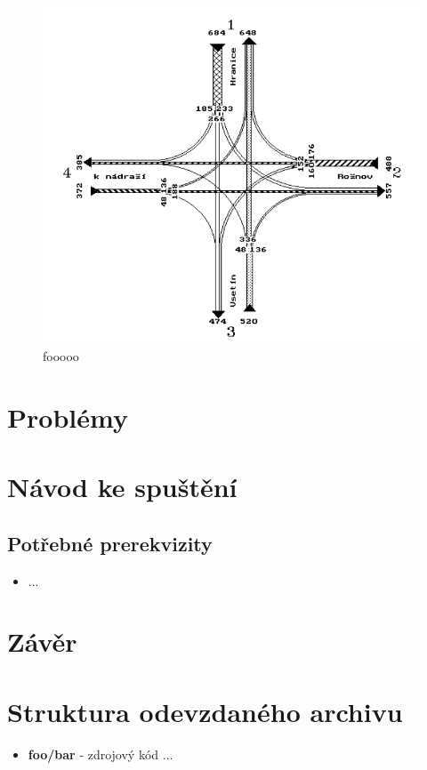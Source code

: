\documentclass[a4paper,11pt]{article}
\begin{document}
\begin{figure}[!h]
	\centering
	\includegraphics[scale=0.34]{fig/graf.png}
	\caption{fooooo}
	\label{fig:foo}
\end{figure}

\section{Problémy}



\section{Návod ke spuštění}
\subsection{Potřebné prerekvizity}
\begin{itemize}
	\item ...

\end{itemize}


\section{Závěr}


\section{Struktura odevzdaného archivu}
\begin{itemize}
	\item \textbf{foo/bar} - zdrojový kód ...

\end{itemize}
\end{document}
